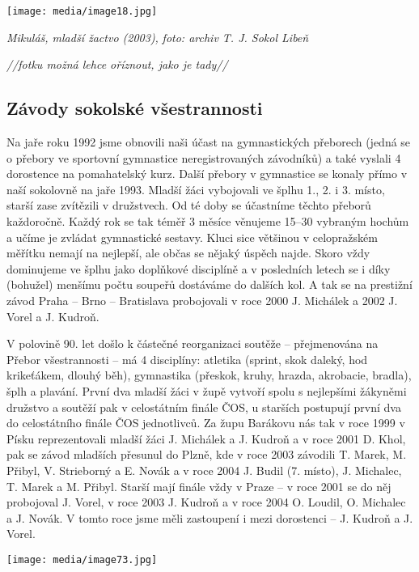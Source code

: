 \texttt{[image: media/image18.jpg]}

\emph{Mikuláš, mladší žactvo (2003),} \emph{foto: archiv T. J. Sokol
Libeň}

\emph{//fotku možná lehce oříznout, jako je tady//}

\subsection{Závody sokolské
všestrannosti}\label{zuxe1vody-sokolskuxe9-vux161estrannosti}

Na jaře roku 1992 jsme obnovili naši účast na gymnastických přeborech
(jedná se o přebory ve sportovní gymnastice neregistrovaných závodníků)
a také vyslali 4 dorostence na pomahatelský kurz. Další přebory v
gymnastice se konaly přímo v naší sokolovně na jaře 1993. Mladší žáci
vybojovali ve šplhu 1., 2. i 3. místo, starší zase zvítězili v
družstvech. Od té doby se účastníme těchto přeborů každoročně. Každý rok
se tak téměř 3 měsíce věnujeme 15--30 vybraným hochům a učíme je zvládat
gymnastické sestavy. Kluci sice většinou v celopražském měřítku nemají
na nejlepší, ale občas se nějaký úspěch najde. Skoro vždy dominujeme ve
šplhu jako doplňkové disciplíně a v posledních letech se i díky
(bohužel) menšímu počtu soupeřů dostáváme do dalších kol. A tak se na
prestižní závod Praha -- Brno -- Bratislava probojovali v roce 2000 J.
Michálek a 2002 J. Vorel a J. Kudroň.

V polovině 90. let došlo k částečné reorganizaci soutěže -- přejmenována
na Přebor všestrannosti -- má 4 disciplíny: atletika (sprint, skok
daleký, hod krikeťákem, dlouhý běh), gymnastika (přeskok, kruhy, hrazda,
akrobacie, bradla), šplh a plavání. První dva mladší žáci v župě vytvoří
spolu s nejlepšími žákyněmi družstvo a soutěží pak v celostátním finále
ČOS, u starších postupují první dva do celostátního finále ČOS
jednotlivců. Za župu Barákovu nás tak v roce 1999 v Písku reprezentovali
mladší žáci J. Michálek a J. Kudroň a v roce 2001 D. Khol, pak se závod
mladších přesunul do Plzně, kde v roce 2003 závodili T. Marek, M.
Přibyl, V. Strieborný a E. Novák a v roce 2004 J. Budil (7. místo), J.
Michalec, T. Marek a M. Přibyl. Starší mají finále vždy v Praze -- v
roce 2001 se do něj probojoval J. Vorel, v roce 2003 J. Kudroň a v roce
2004 O. Loudil, O. Michalec a J. Novák. V tomto roce jsme měli
zastoupení i mezi dorostenci -- J. Kudroň a J. Vorel.

\texttt{[image: media/image73.jpg]}

